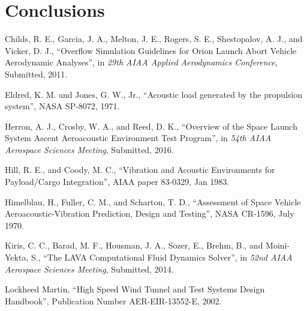 \documentclass[]{aiaa-tc}%
\begin{document}
\section{Conclusions}















\begin{thebibliography}{9}%

Childs, R. E., Garcia, J. A., Melton, J. E., Rogers, S. E., Shestopalov, A. J., and Vicker, D. J., ``Overflow Simulation Guidelines for Orion Launch
Abort Vehicle Aerodynamic Analyses'', in {\it 29th AIAA Applied Aerodynamics Conference}, Submitted, 2011.

Eldred, K. M. and Jones, G. W., Jr., ``Acoustic load generated by the propulsion system'', NASA SP-8072, 1971.

Herron, A. J., Crosby, W. A., and Reed, D. K., ``Overview of the Space Launch System Ascent Aeroacoustic Environment Test Program'', in {\it 54th AIAA Aerospace Sciences Meeting}, Submitted, 2016.

Hill, R. E., and Coody, M. C., ``Vibration and Acoustic Environments for Payload/Cargo Integration'', AIAA paper 83-0329, Jan 1983.

Himelblau, H., Fuller, C. M., and Scharton, T. D., ``Assessment of Space Vehicle Aeroacoustic-Vibration Prediction, Design and Testing'', NASA CR-1596, July 1970.

Kiris, C. C., Barad, M. F., Housman, J. A., Sozer, E., Brehm, B., and Moini-Yekta, S.,  ``The LAVA Computational Fluid Dynamics Solver'', in {\it 52nd AIAA Aerospace Sciences Meeting}, Submitted, 2014.

Lockheed Martin,  ``High Speed Wind Tunnel and Test Systems Design Handbook'', Publication Number AER-EIR-13552-E, 2002.


\end{thebibliography}
\end{document}

